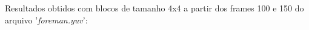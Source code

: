 \documentclass[journal]{IEEEtran}
\begin{document}
\begin{figure}[h]
\end{figure}

Resultados obtidos com blocos de tamanho 4x4 a partir dos frames 100 e 150 do arquivo '\textit{foreman.yuv}':
\end{document}
